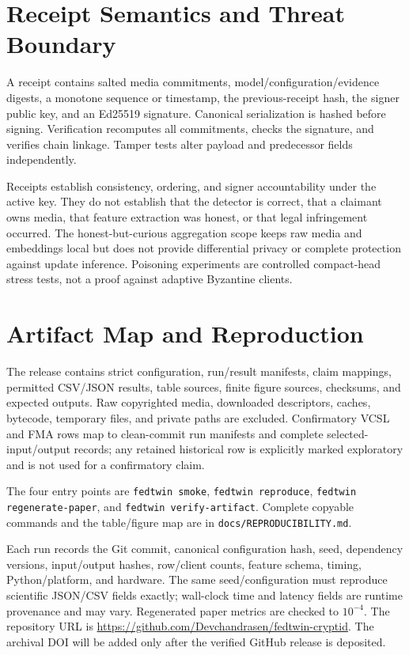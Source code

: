 \documentclass[journal]{IEEEtran}
\begin{document}
\balance
\section{Receipt Semantics and Threat Boundary}

A receipt contains salted media commitments, model/configuration/evidence digests, a monotone sequence or timestamp, the previous-receipt hash, the signer public key, and an Ed25519 signature. Canonical serialization is hashed before signing. Verification recomputes all commitments, checks the signature, and verifies chain linkage. Tamper tests alter payload and predecessor fields independently.

Receipts establish consistency, ordering, and signer accountability under the active key. They do not establish that the detector is correct, that a claimant owns media, that feature extraction was honest, or that legal infringement occurred. The honest-but-curious aggregation scope keeps raw media and embeddings local but does not provide differential privacy or complete protection against update inference. Poisoning experiments are controlled compact-head stress tests, not a proof against adaptive Byzantine clients.

\section{Artifact Map and Reproduction}

The release contains strict configuration, run/result manifests, claim mappings, permitted CSV/JSON results, table sources, finite figure sources, checksums, and expected outputs. Raw copyrighted media, downloaded descriptors, caches, bytecode, temporary files, and private paths are excluded. Confirmatory VCSL and FMA rows map to clean-commit run manifests and complete selected-input/output records; any retained historical row is explicitly marked exploratory and is not used for a confirmatory claim.

The four entry points are \texttt{fedtwin smoke}, \texttt{fedtwin reproduce}, \texttt{fedtwin regenerate-paper}, and \texttt{fedtwin verify-artifact}. Complete copyable commands and the table/figure map are in \texttt{docs/REPRODUCIBILITY.md}.

Each run records the Git commit, canonical configuration hash, seed, dependency versions, input/output hashes, row/client counts, feature schema, timing, Python/platform, and hardware. The same seed/configuration must reproduce scientific JSON/CSV fields exactly; wall-clock time and latency fields are runtime provenance and may vary. Regenerated paper metrics are checked to $10^{-4}$. The repository URL is \url{https://github.com/Devchandrasen/fedtwin-cryptid}. The archival DOI will be added only after the verified GitHub release is deposited.
\end{document}
